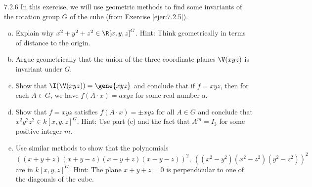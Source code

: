 \documentclass[twoside]{article}
\begin{document}
\begin{ejercicio}{7.2.6}
In this exercise, we will use geometric methods to find some invariants of the rotation group $G$ of the cube (from Exercise \ref{ejer:7.2.5}). 
\begin{enumerate}[a.]
\item Explain why $x^2 + y^2 + z^2 \in \R[x, y, z]^G$.
Hint: Think geometrically in terms of distance to the origin.
\item Argue geometrically that the union of the three coordinate planes $\V(xyz)$ is invariant under $G$.
\item Show that $\I(\V(xyz)) = \gene{xyz}$ and conclude that if $f = xyz$, then for each $A \in G$, we have $f(A\cdot x) = axyz$ for some real number a.
\item Show that $f = xyz$ satisfies $f (A \cdot x) = \pm xyz$ for all $A \in G$ and conclude that $x^2y^2z^2 \in k[x, y, z]^G$.
Hint: Use part (c) and the fact that $A^m = I_3$ for some positive integer $m$.
\item Use similar methods to show that the polynomials
\[ \left((x+y+z)(x+y-z)(x-y+z)(x-y-z)\right)^2,\ \left((x^2-y^2)(x^2-z^2)(y^2-z^2)\right)^2 \]
are in $k[x,y,z]^G$.
Hint: The plane $x+y+z = 0$ is perpendicular to one of the diagonals of the cube.
\end{enumerate}
\end{ejercicio}
\end{document}

